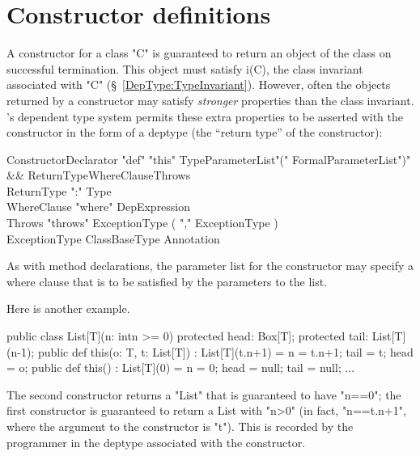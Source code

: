 \section{Constructor definitions}

A constructor for a class \xcd"C" is guaranteed to return an object of the
class on successful termination. This object must satisfy i(C), the
class invariant associated with \xcd"C" (\S~\ref{DepType:TypeInvariant}). However,
often the objects returned by a constructor may satisfy {\em stronger}
properties than the class invariant. \Xten{}'s dependent type system
permits these extra properties to be asserted with the constructor in
the form of a deptype (the ``return type'' of the constructor):

\begin{grammar}
ConstructorDeclarator \:
  \xcd"def" \xcd"this" TypeParameterList\opt \xcd"(" FormalParameterList\opt \xcd")" \\
  && ReturnType\opt WhereClause\opt Throws\opt \\
ReturnType    \: \xcd":" Type \\
WhereClause   \: \xcd"where" DepExpression \\
Throws    \: \xcd"throws" ExceptionType  ( \xcd"," ExceptionType )\star \\
ExceptionType \: ClassBaseType Annotation\star \\
\end{grammar}

As with method declarations, the parameter list for the constructor
may specify a where clause that is to be satisfied by the parameters
to the list.

\begin{example}
Here is another example.
\begin{xten}
public class List[T](n: int{n >= 0}) {
    protected head: Box[T];
    protected tail: List[T](n-1);
    public def this(o: T, t: List[T]) : List[T](t.n+1) = {
        n = t.n+1;
        tail = t;
        head = o;
    }
    public def this() : List[T](0) = {
        n = 0;
        head = null;
        tail = null;
    }
    ...
}
\end{xten}
The second constructor returns a \xcd"List" that is guaranteed to have
\xcd"n==0";
the first constructor is guaranteed to return a List with \xcd"n>0"
(in fact, \xcd"n==t.n+1", where the argument to the constructor is \xcd"t"). 
This is recorded by the programmer in the deptype associated with the
constructor.
\end{example}

